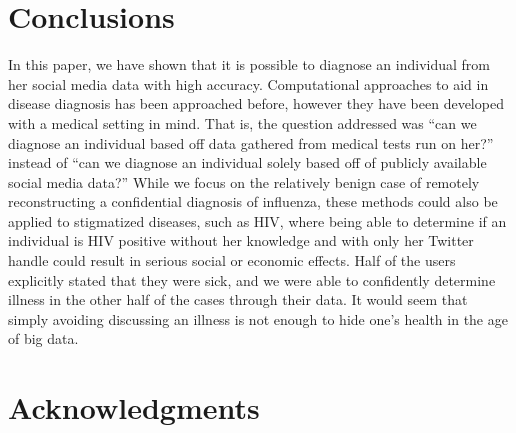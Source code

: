\documentclass{acm_proc_article-sp}
\begin{document}
\section{Conclusions}


In this paper, we have shown that it is possible to diagnose an individual from her social media data with high accuracy. Computational approaches to aid in disease diagnosis has been approached before, however they have been developed with a medical setting in mind. That is, the question addressed was ``can we diagnose an individual based off data gathered from medical tests run on her?'' instead of ``can we diagnose an individual solely based off of publicly available social media data?''  While we focus on the relatively benign case of remotely reconstructing a confidential diagnosis of influenza, these methods could also be applied to stigmatized diseases, such as HIV, where being able to determine if an individual is HIV positive without her knowledge and with only her Twitter handle could result in serious social or economic effects. Half of the users explicitly stated that they were sick, and we were able to confidently determine illness in the other half of the cases through their data. It would seem that simply avoiding discussing an illness is not enough to hide one's health in the age of big data. 


\section{Acknowledgments}
\end{document}
